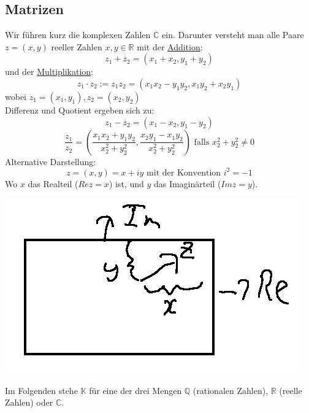 \subsection{Matrizen}
Wir führen kurz die komplexen Zahlen $\mathbb{C}$ ein.  Darunter versteht man alle Paare $z=(x,y)$ reeller Zahlen $x,y\in \mathbb{R}$ mit der \underline{Addition}: \[z_1+z_2=(x_1+x_2,y_1+y_2)\] und der \underline{Multiplikation}: \[z_1\cdot z_2:=z_1z_2=(x_1x_2-y_1y_2,x_1y_2+x_2y_1)\] wobei $z_1=(x_1,y_1),z_2=(x_2,y_2)$ \\
Differenz und Quotient ergeben sich zu:
\[ z_1-z_2=(x_1-x_2,y_1-y_2)\]
\[\dfrac{z_1}{z_2} = \left(\dfrac{x_1x_2+y_1y_2}{x_2^2+y_2^2},\dfrac{x_2y_1-x_1y_2}{x_2^2+y_2^2}\right) \text{ falls } x_2^2+y_2^2\not = 0\]
Alternative Darstellung:
\[z=(x,y) = x+iy \text{ mit der Konvention } i^2=-1\]
Wo $x$ das Realteil ($Rez=x$) ist, und $y$ das Imaginärteil ($Imz=y$).\\
\begin{center}
\includegraphics[scale=0.4]{1-3.jpg}
\end{center}
Im Folgenden stehe $\mathbb{K}$ für eine der drei Mengen $\mathbb{Q}$ (rationalen Zahlen), $\mathbb{R}$ (reelle Zahlen) oder $\mathbb{C}$.
